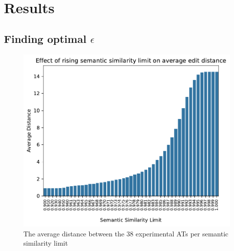 \section{Results}
\label{sec:results}

\subsection{Finding optimal $\epsilon$}

\begin{figure}
    \includegraphics[width=\linewidth]{code/img/similaritylimits.pdf}
\caption{The average distance between the 38 experimental ATs per semantic similarity limit}
\label{img:similaritylimits}
\end{figure}
